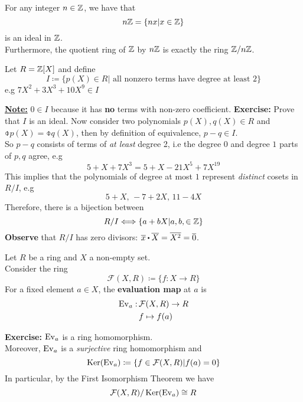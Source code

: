 \documentclass[../Main.tex]{subfiles}
\begin{document}
\begin{example}
	For any integer $n\in \mathbb{Z}$, we have that
	\[n\mathbb{Z} = \{nx|x\in \mathbb{Z}\}\] 
	is an ideal in $\mathbb{Z}$.\\
	Furthermore, the quotient ring of $\mathbb{Z}$ by $n\mathbb{Z}$ is exactly the ring $\mathbb{Z}/n\mathbb{Z}$.
\end{example}
\begin{example}
	Let $R=\mathbb{Z}[X]$ and define
	\[I \coloneqq \{p(X)\in R| \text{ all nonzero terms have degree at least 2}\}\]
	e.g $7X^2+3X^3+10X^9\in I$
\end{example}
\underline{\textbf{Note:}} $0\in I$ because it has \textbf{no} terms with non-zero coefficient.
\textbf{Exercise:} Prove that $I$ is an ideal.
Now consider two polynomials $p(X),q(X)\in R$ and $\obar{p(X)}=\obar{q(X)}$, then by definition of equivalence, $p-q\in I$.\\
So $p-q$ consists of terms of \textit{at least} degree 2, i.e the degree $0$ and degree $1$ parts of $p,q$ agree, e.g
\[5+X+7X^3=5+X-21X^5+7X^{19}\]
This implies that the polynomials of degree at most $1$ represent \textit{distinct} cosets in $R/I$, e.g
\[5+X,\, -7+2X,\,11-4X\]
Therefore, there is a bijection between
\[R/I \Longleftrightarrow \{a+bX|a,b,\in \mathbb{Z}\}\]
\textbf{Observe} that $R/I$ has zero divisors: $\obar{x}\rdot \obar{X}=\obar{X^2}=\obar{0}$.
\begin{example}
	Let $R$ be a ring and $X$ a non-empty set.\\
	Consider the ring
	\[\mathcal{F}(X,R) \coloneqq \{f:X\to R\}\]
	For a fixed element $a\in X$, the \textbf{evaluation map} at $a$ is
	\begin{align*}
		\operatorname{Ev}_a : \,&\mathcal{F}(X,R)\to R\\
		&f\mapsto f(a)
	\end{align*}
\end{example}
\textbf{Exercise: } $\operatorname{Ev}_a$ is a ring homomorphism.\\
Moreover, $\operatorname{Ev}_a$ is a \textit{surjective} ring homomorphism and 
\[\operatorname{Ker}(\operatorname{Ev}_a)\coloneqq \{f\in \mathcal{F}(X,R)|f(a)=0\}\]
In particular, by the First Isomorphism Theorem we have
\[\mathcal{F}(X,R)/\operatorname{Ker}(\operatorname{Ev}_a)\cong R\]
\end{document}
